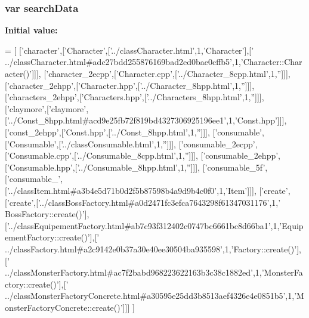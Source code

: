 \subsubsection[{search\-Data}]{\setlength{\rightskip}{0pt plus 5cm}var search\-Data}\label{all__3_8js_ad01a7523f103d6242ef9b0451861231e}
{\bfseries Initial value\-:}
\begin{DoxyCode}
=
[
  [\textcolor{stringliteral}{'character'},[\textcolor{stringliteral}{'Character'},[\textcolor{stringliteral}{'../classCharacter.html'},1,\textcolor{stringliteral}{'Character'}],[\textcolor{stringliteral}{'
      ../classCharacter.html#adc27bdd255876169bad2ed0bae0cffb5'},1,\textcolor{stringliteral}{'Character::Character()'}]]],
  [\textcolor{stringliteral}{'character\_2ecpp'},[\textcolor{stringliteral}{'Character.cpp'},[\textcolor{stringliteral}{'../Character\_8cpp.html'},1,\textcolor{stringliteral}{''}]]],
  [\textcolor{stringliteral}{'character\_2ehpp'},[\textcolor{stringliteral}{'Character.hpp'},[\textcolor{stringliteral}{'../Character\_8hpp.html'},1,\textcolor{stringliteral}{''}]]],
  [\textcolor{stringliteral}{'characters\_2ehpp'},[\textcolor{stringliteral}{'Characters.hpp'},[\textcolor{stringliteral}{'../Characters\_8hpp.html'},1,\textcolor{stringliteral}{''}]]],
  [\textcolor{stringliteral}{'claymore'},[\textcolor{stringliteral}{'claymore'},[\textcolor{stringliteral}{'../Const\_8hpp.html#acd9e25fb72f819bd4327306925196ee1'},1,\textcolor{stringliteral}{'Const.hpp'}]]],
  [\textcolor{stringliteral}{'const\_2ehpp'},[\textcolor{stringliteral}{'Const.hpp'},[\textcolor{stringliteral}{'../Const\_8hpp.html'},1,\textcolor{stringliteral}{''}]]],
  [\textcolor{stringliteral}{'consumable'},[\textcolor{stringliteral}{'Consumable'},[\textcolor{stringliteral}{'../classConsumable.html'},1,\textcolor{stringliteral}{''}]]],
  [\textcolor{stringliteral}{'consumable\_2ecpp'},[\textcolor{stringliteral}{'Consumable.cpp'},[\textcolor{stringliteral}{'../Consumable\_8cpp.html'},1,\textcolor{stringliteral}{''}]]],
  [\textcolor{stringliteral}{'consumable\_2ehpp'},[\textcolor{stringliteral}{'Consumable.hpp'},[\textcolor{stringliteral}{'../Consumable\_8hpp.html'},1,\textcolor{stringliteral}{''}]]],
  [\textcolor{stringliteral}{'consumable\_5f'},[\textcolor{stringliteral}{'consumable\_'},[\textcolor{stringliteral}{'../classItem.html#a3b4e5d71b0d2f5b87598b4a9d9b4c0f0'},1,\textcolor{stringliteral}{'Item'}]]],
  [\textcolor{stringliteral}{'create'},[\textcolor{stringliteral}{'create'},[\textcolor{stringliteral}{'../classBossFactory.html#a0d2471fc3efca7643298f61347031176'},1,\textcolor{stringliteral}{'
      BossFactory::create()'}],[\textcolor{stringliteral}{'../classEquipementFactory.html#ab7c93f312402c0747bc6661bc8d66ba1'},1,\textcolor{stringliteral}{'EquipementFactory::create()'}],[\textcolor{stringliteral}{'
      ../classFactory.html#a2c9142e0b37a30e40ee30504ba935598'},1,\textcolor{stringliteral}{'Factory::create()'}],[\textcolor{stringliteral}{'
      ../classMonsterFactory.html#ac7f2babd968223622163b3c38c1882ed'},1,\textcolor{stringliteral}{'MonsterFactory::create()'}],[\textcolor{stringliteral}{'
      ../classMonsterFactoryConcrete.html#a30595e25dd3b8513aef4326e4e0851b5'},1,\textcolor{stringliteral}{'MonsterFactoryConcrete::create()'}]]]
]
\end{DoxyCode}
